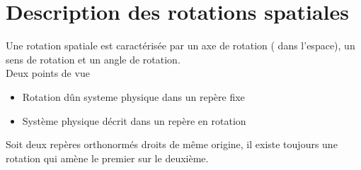 \documentclass[../main.tex]{subfiles}
\begin{document}

\section{Description des rotations spatiales}
Une rotation spatiale est caractérisée par un axe de rotation ( dans l'espace), un sens de rotation et un angle de rotation.\\
Deux points de vue
\begin{itemize}
	\item Rotation dûn systeme physique dans un repère fixe
	\item Système physique décrit dans un repère en rotation
\end{itemize}
\begin{thm}
Soit deux repères orthonormés droits de même origine, il existe toujours une rotation qui amène le premier sur le deuxième.
\end{thm}
\end{document}
